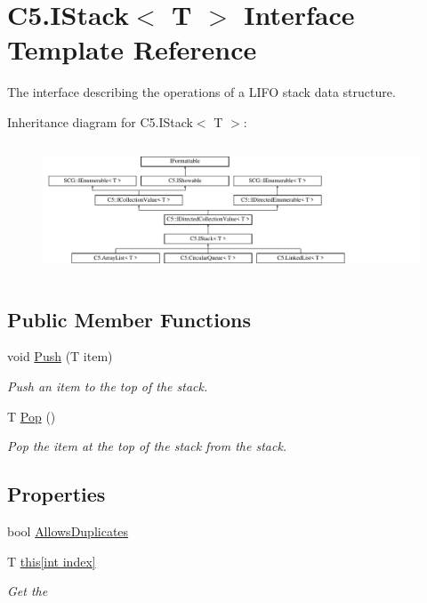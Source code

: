 \hypertarget{interface_c5_1_1_i_stack}{}\section{C5.\+I\+Stack$<$ T $>$ Interface Template Reference}
\label{interface_c5_1_1_i_stack}


The interface describing the operations of a L\+I\+F\+O stack data structure.  


Inheritance diagram for C5.\+I\+Stack$<$ T $>$\+:\begin{figure}[H]
\begin{center}
\leavevmode
\includegraphics[height=3.943662cm]{interface_c5_1_1_i_stack}
\end{center}
\end{figure}
\subsection*{Public Member Functions}
\begin{DoxyCompactItemize}
\item 
void \hyperlink{interface_c5_1_1_i_stack_a98462dd9cda5d818fc1bce6a5055f000}{Push} (T item)
\begin{DoxyCompactList}\small\item\em Push an item to the top of the stack. \end{DoxyCompactList}\item 
T \hyperlink{interface_c5_1_1_i_stack_ad85678b4d9f9a1277b02d5913d0e1d55}{Pop} ()
\begin{DoxyCompactList}\small\item\em Pop the item at the top of the stack from the stack. \end{DoxyCompactList}\end{DoxyCompactItemize}
\subsection*{Properties}
\begin{DoxyCompactItemize}
\item 
bool \hyperlink{interface_c5_1_1_i_stack_a1c4090df5f9382ceb912e26da65192fa}{Allows\+Duplicates}
\item 
T \hyperlink{interface_c5_1_1_i_stack_a38a9bdc0918c936c3b6fd78b3d68cdf1}{this\mbox{[}int index\mbox{]}}
\begin{DoxyCompactList}\small\item\em Get the \end{DoxyCompactList}\end{DoxyCompactItemize}
